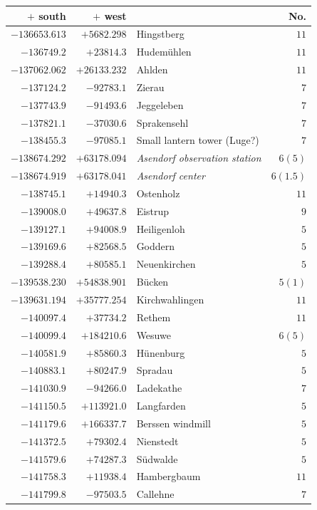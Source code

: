 \begin{center}\begingroup\fontsize{8}{9}\selectfont
\setlength{\tabcolsep}{4pt}
\begin{tabular}{r|r|p{170pt}|r}\hline
\(+\) south&\(+\) west&&No.\\\hline
\(-136653.613\)&\(+5682.298\)&Hingstberg&\(11\)\\
\(-136749.2\)&\(+23814.3\)&Hudemühlen&\(11\)\\
\(-137062.062\)&\(+26133.232\)&Ahlden&\(11\)\\
\(-137124.2\)&\(-92783.1\)&Zierau&\(7\)\\
\(-137743.9\)&\(-91493.6\)&Jeggeleben&\(7\)\\
\(-137821.1\)&\(-37030.6\)&Sprakensehl&\(7\)\\
\(-138455.3\)&\(-97085.1\)&Small lantern tower (Luge?)&\(7\)\\
\(-138674.292\)&\(+63178.094\)&\textit{Asendorf observation station}&\(6 (5)\)\\
\(-138674.919\)&\(+63178.041\)&\textit{Asendorf center}&\(6(1.5)\)\\
\(-138745.1\)&\(+14940.3\)&Ostenholz&\(11\)\\
\(-139008.0\)&\(+49637.8\)&Eistrup&\(9\)\\
\(-139127.1\)&\(+94008.9\)&Heiligenloh&\(5\)\\
\(-139169.6\)&\(+82568.5\)&Goddern&\(5\)\\
\(-139288.4\)&\(+80585.1\)&Neuenkirchen&\(5\)\\
\(-139538.230\)&\(+54838.901\)&Bücken&\(5 (1)\)\\
\(-139631.194\)&\(+35777.254\)&Kirchwahlingen&\(11\)\\
\(-140097.4\)&\(+37734.2\)&Rethem&\(11\)\\
\(-140099.4\)&\(+184210.6\)&Wesuwe&\(6 (5)\)\\
\(-140581.9\)&\(+85860.3\)&Hünenburg&\(5\)\\
\(-140883.1\)&\(+80247.9\)&Spradau&\(5\)\\
\(-141030.9\)&\(-94266.0\)&Ladekathe&\(7\)\\
\(-141150.5\)&\(+113921.0\)&Langfarden&\(5\)\\
\(-141179.6\)&\(+166337.7\)&Berssen windmill&\(5\)\\
\(-141372.5\)&\(+79302.4\)&Nienstedt&\(5\)\\
\(-141579.6\)&\(+74287.3\)&Südwalde&\(5\)\\
\(-141758.3\)&\(+11938.4\)&Hambergbaum&\(11\)\\
\(-141799.8\)&\(-97503.5\)&Callehne&\(7\)\\

\end{tabular}
\end{center}
